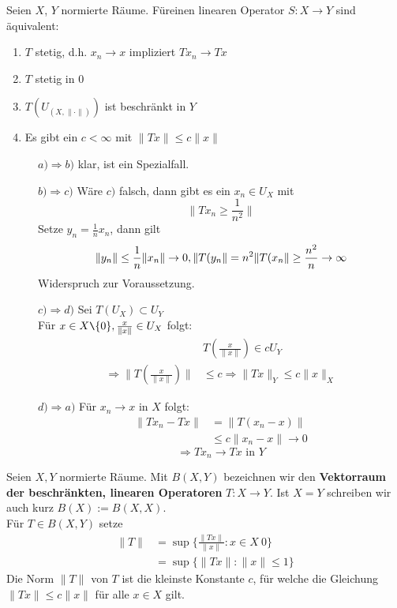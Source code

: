 \begin{satz}
	Seien $X$, $Y$ normierte Räume. Füreinen linearen Operator $S: X \rightarrow Y$ sind äquivalent:
	\begin{enumerate}[label=\alph*\upshape)]
		\item $T$ stetig, d.h. $x_{n} \rightarrow x$ impliziert $Tx_{n} \rightarrow Tx$
		\item $T$ stetig in 0
		\item $T(U_{(X, \| \cdot \|)})$ ist beschränkt in $Y$
		\item Es gibt ein $c < \infty$ mit $\| Tx \| \leq c \| x \|$
	\end{enumerate}	
\end{satz}
\begin{beweis}
	\begin{description}
		\item[] $a) \Rightarrow b)$ klar, ist ein Spezialfall.
		\item[] $b) \Rightarrow c)$ Wäre $c)$ falsch, dann gibt es ein $x_{n} \in U_{X}$ mit 
		\[ \| T x_{n} \geq \frac{1}{n^{2}} \| \]
		Setze $y_{n} = \frac{1}{n} x_{n}$, dann gilt
		\[
			\| y_{n} \| \leq \frac{1}{n} \| x_{n} \| \rightarrow 0, \\
			\| T(y_{n} \| = n^{2} \| T(x_{n} \| \geq \frac{n^2}{n} \rightarrow \infty 
		 \]
		 Widerspruch zur Voraussetzung.
		 \item[] $c) \Rightarrow d)$ Sei $T(U_{X}) \subset U_{Y}$ \\
		 Für $x \in X \verb|\| \{0\}, \frac{x}{\| x \|} \in U_{X}$ folgt:
		 \begin{align*}
		 	&T \left( \frac{x}{\| x \|} \right) \in c U_{Y} \\
		 	\Rightarrow \| T \left( \frac{x}{\| x \|} \right) \| & \leq c
		 	\Rightarrow \| T x \|_{Y} \leq c \| x \|_{X}			
		 \end{align*}
		 \item[] $d) \Rightarrow a)$ Für $x_{n} \rightarrow x$ in $X$ folgt:
		 \begin{align*}
		 	\| T x_{n} - T x \| & = \| T ( x_{n} - x ) \| \\
		 						& \leq c \| x_{n} - x \| \rightarrow 0
		 \end{align*} \[ \Rightarrow T x_{n} \rightarrow T x \text{ in } Y \]
	\end{description}
\end{beweis}
	
\begin{definition}
	Seien $X, Y$ normierte Räume. Mit $B(X, Y)$ bezeichnen wir den \textbf{Vektorraum der beschränkten, linearen Operatoren} $T: X \rightarrow Y$. Ist $ X = Y$ schreiben wir auch kurz $B(X) := B(X, X)$. \\
	
	Für $T \in B(X, Y)$ setze
	\begin{align*}
		\| T \| & = \sup \{ \frac{\| Tx \|}{\| x \|}: x \in X \ {0} \} \\
				& = \sup \{ \| Tx \|: \| x \| \leq 1 \}
	\end{align*}
	Die Norm $\| T \|$ von $T$ ist die kleinste Konstante $c$, für welche die Gleichung $\| Tx \| \leq c \| x \|$ für alle $x \in X$ gilt.
\end{definition}

